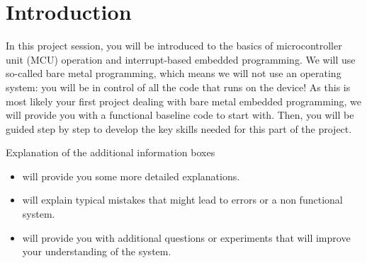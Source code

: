 \section*{Introduction}

In this project session, you will be introduced to the basics of microcontroller unit (MCU) operation and interrupt-based embedded programming. We will use so-called bare metal programming, which means we will not use an operating system: you will be in control of all the code that runs on the device! As this is most likely your first project dealing with bare metal embedded programming, we will provide you with a functional baseline code to start with. Then, you will be guided step by step to develop the key skills needed for this part of the project.
\begin{bclogo}[couleur = gray!20, arrondi = 0.2, logo=\bcinfo]{Explanation of the additional information boxes}
\begin{itemize}
    \item \bcinfo will provide you some more detailed explanations.
    \item \bcattention will explain typical mistakes that might lead to errors or a non functional system.
    \item \bcquestion will provide you with additional questions or experiments that will improve your understanding of the system.
\end{itemize}
\end{bclogo}
